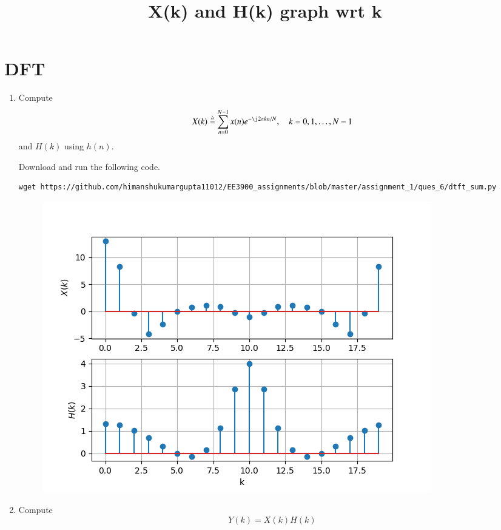\documentclass[journal,12pt,twocolumn]{IEEEtran}
\renewcommand\thesection{\arabic{section}}
\begin{document}
\section{DFT}
\begin{enumerate}[label=\thesection.\arabic*]
\item
Compute
\begin{equation}
X(k) \define \sum _{n=0}^{N-1}x(n) e^{-\j2\pi kn/N}, \quad k = 0,1,\dots, N-1
\end{equation}
and $H(k)$ using $h(n)$.

\solution Download and run the following code.
\begin{lstlisting}
wget https://github.com/himanshukumargupta11012/EE3900_assignments/blob/master/assignment_1/ques_6/dtft_sum.py
\end{lstlisting}
\begin{figure}[!ht]
	\centering
	\includegraphics[width=\columnwidth]{./ques_6/dtft_sum}
	\title{X(k) and H(k) graph wrt k}
	\label{fig:dtft_sum}
\end{figure}
\item Compute 
\begin{equation}
Y(k) = X(k)H(k)
\end{equation}


\end{enumerate}
\end{document}
